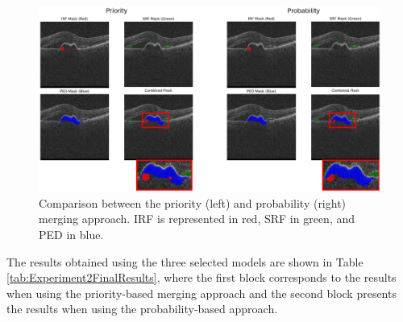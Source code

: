 \begin{figure}[!ht]
	\centering
	\includegraphics[width=1.0\linewidth]{figures/ProbabilityVsPrioritySegmentation.png}
	\caption{Comparison between the priority (left) and probability (right) merging approach. IRF is represented in red, SRF in green, and PED in blue.}
	\label{fig:ProbabilityVsPrioritySegmentation}
\end{figure}

The results obtained using the three selected models are shown in Table \ref{tab:Experiment2FinalResults}, where the first block corresponds to the results when using the priority-based merging approach and the second block presents the results when using the probability-based approach.

